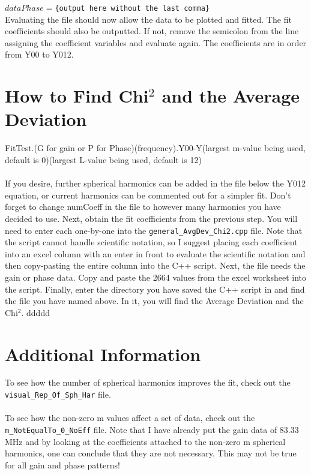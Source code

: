 \documentclass[11pt]{article} %
\begin{document}
\texttt{$dataPhase = $\{output here without the last comma\}}\\

Evaluating the file should now allow the data to be plotted and fitted. The fit coefficients should also be outputted. If not, remove the semicolon from the line assigning the coefficient variables and evaluate again. The coefficients are in order from Y00 to Y012.


\section{How to Find Chi$^2$ and the Average Deviation}

 FitTest.(G for gain or P for Phase)(frequency).Y00-Y(largest m-value being used, default is 0)(largest L-value being used, default is 12) \\ \\
If you desire, further spherical harmonics can be added in the file below the Y012 equation, or current harmonics can be commented out for a simpler fit. Don't forget to change numCoeff in the file to however many harmonics you have decided to use.
Next, obtain the fit coefficients from the previous step. You will need to enter each one-by-one into the \texttt{general\_AvgDev\_Chi2.cpp} file. Note that the script cannot handle scientific notation, so I suggest placing each coefficient into an excel column with an enter in front to evaluate the scientific notation and then copy-pasting the entire column into the C++ script. Next, the file needs the gain or phase data. Copy and paste the 2664 values from the excel worksheet into the script. Finally, enter the directory you have saved the C++ script in and find the file you have named above. In it, you will find the Average Deviation and the Chi$^2$. ddddd


\section{Additional Information}

To see how the number of spherical harmonics improves the fit, check out the \texttt{visual\_Rep\_Of\_Sph\_Har} file.\\ \\
To see how the non-zero m values affect a set of data, check out the \texttt{m\_NotEqualTo\_0\_NoEff} file. Note that I have already put the gain data of 83.33 MHz and by looking at the coefficients attached to the non-zero m spherical harmonics, one can conclude that they are not necessary. This may not be true for all gain and phase patterns!
\end{document}
